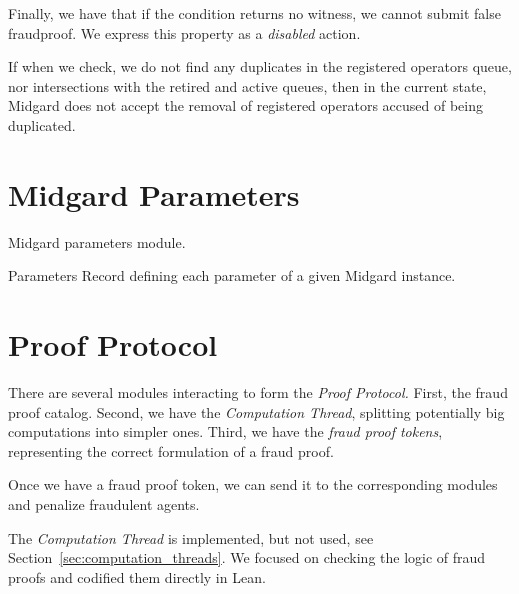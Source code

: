 Finally, we have that if the condition returns no witness, we cannot submit
false fraudproof.
%
We express this property as a \emph{disabled} action.

\begin{theorem}
  \label{thm:OpsDir.OptimisticProof.DisableFPSubmittion}
  \leanok

  If when we check, we do not find any duplicates in the registered operators
queue, nor intersections with the retired and active queues, then  in the
current state, Midgard does not accept the removal of registered operators
accused of being duplicated.
  \end{theorem}


\section{Midgard Parameters}

Midgard parameters module.

\begin{definition}{Parameters}
\label{dfn:MidgardParameters}
\leanok
Record defining each parameter of a given Midgard instance.
\end{definition}


\section{Proof Protocol}

There are several modules interacting to form the \emph{Proof Protocol.}
%
First, the fraud proof catalog.
%
Second, we have the \emph{Computation Thread}, splitting potentially big
computations into simpler ones.
%
Third, we have the \emph{fraud proof tokens}, representing the correct
formulation of a fraud proof.

Once we have a fraud proof token, we can send it to the corresponding modules
and penalize fraudulent agents.

The \emph{Computation Thread} is implemented, but not used, see
Section~\ref{sec:computation_threads}.
%
We focused on checking the logic of fraud proofs and codified them directly in
Lean.

